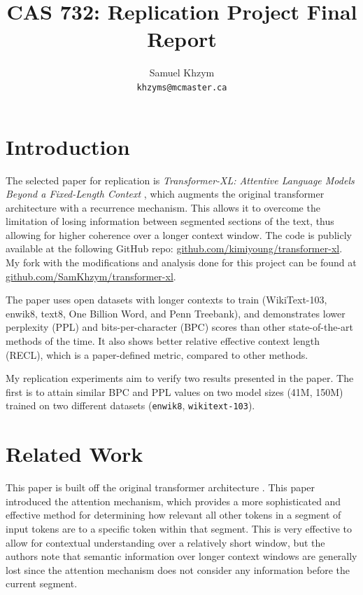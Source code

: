 \documentclass[11pt]{article}
\title{CAS 732: Replication Project Final Report}
\author{Samuel Khzym \\
  \texttt{khzyms@mcmaster.ca}}
\begin{document}
\nolinenumbers

\maketitle

\section{Introduction}

The selected paper for replication is \textit{Transformer-XL: Attentive Language Models Beyond a Fixed-Length Context} \cite{dai2019transformerxlattentivelanguagemodels}, which augments the original transformer architecture with a recurrence mechanism. This allows it to overcome the limitation of losing information between segmented sections of the text, thus allowing for higher coherence over a longer context window. The code is publicly available at the following GitHub repo: \url{github.com/kimiyoung/transformer-xl}. My fork with the modifications and analysis done for this project can be found at \url{github.com/SamKhzym/transformer-xl}.

The paper uses open datasets with longer contexts to train (WikiText-103, enwik8, text8, One Billion Word, and Penn Treebank), and demonstrates lower perplexity (PPL) and bits-per-character (BPC) scores than other state-of-the-art methods of the time. It also shows better relative effective context length (RECL), which is a paper-defined metric, compared to other methods.

My replication experiments aim to verify two results presented in the paper. The first is to attain similar BPC and PPL values on two model sizes (41M, 150M) trained on two different datasets (\verb|enwik8|, \verb|wikitext-103|). 

\section{Related Work}

This paper is built off the original transformer architecture \cite{vaswani2023attentionneed}. This paper introduced the attention mechanism, which provides a more sophisticated and effective method for determining how relevant all other tokens in a segment of input tokens are to a specific token within that segment. This is very effective to allow for contextual understanding over a relatively short window, but the authors note that semantic information over longer context windows are generally lost since the attention mechanism does not consider any information before the current segment.
\end{document}
